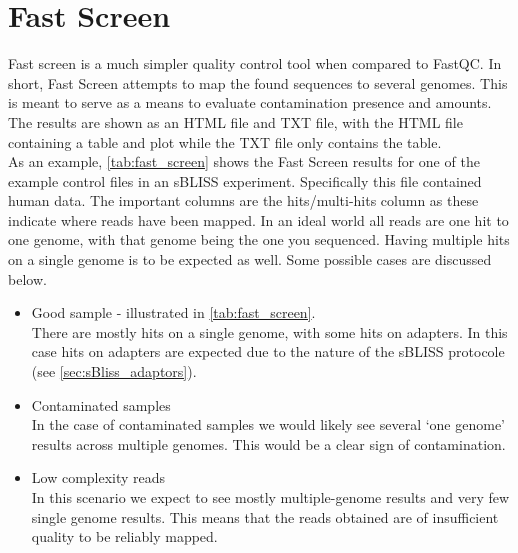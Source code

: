 \section{Fast Screen \label{sec:Fast_Screen}}
Fast screen is a much simpler quality control tool when compared to FastQC. In short, Fast Screen attempts to map the found sequences to several genomes. This is meant to serve as a means to evaluate contamination presence and amounts.\\
The results are shown as an HTML file and TXT file, with the HTML file containing a table and plot while the TXT file only contains the table.\\
As an example, \autoref{tab:fast_screen} shows the Fast Screen results for one of the example control files in an sBLISS experiment. Specifically this file contained human data. The important columns are the hits/multi-hits column as these indicate where reads have been mapped. In an ideal world all reads are one hit to one genome, with that genome being the one you sequenced. Having multiple hits on a single genome is to be expected as well. Some possible cases are discussed below.\\
\clearpage
\begin{itemize}
\item Good sample - illustrated in \autoref{tab:fast_screen}.\\
There are mostly hits on a single genome, with some hits on adapters. In this case hits on adapters are expected due to the nature of the sBLISS protocole (see \autoref{sec:sBliss_adaptors}).
\item Contaminated samples\\
In the case of contaminated samples we would likely see several `one genome' results across multiple genomes. This would be a clear sign of contamination.
\item Low complexity reads\\
In this scenario we expect to see mostly multiple-genome results and very few single genome results. This means that the reads obtained are of insufficient quality to be reliably mapped.
\end{itemize}
